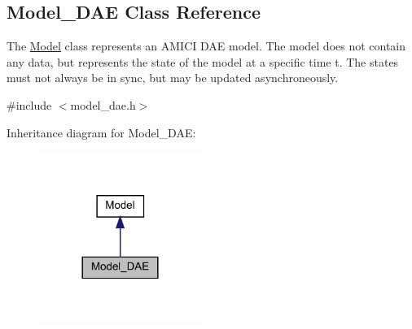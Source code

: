 \hypertarget{classamici_1_1_model___d_a_e}{}\subsection{Model\+\_\+\+D\+AE Class Reference}
\label{classamici_1_1_model___d_a_e}


The \mbox{\hyperlink{classamici_1_1_model}{Model}} class represents an A\+M\+I\+CI D\+AE model. The model does not contain any data, but represents the state of the model at a specific time t. The states must not always be in sync, but may be updated asynchroneously.  




{\ttfamily \#include $<$model\+\_\+dae.\+h$>$}



Inheritance diagram for Model\+\_\+\+D\+AE\+:
\nopagebreak
\begin{figure}[H]
\begin{center}
\leavevmode
\includegraphics[width=149pt]{classamici_1_1_model___d_a_e__inherit__graph}
\end{center}
\end{figure}
